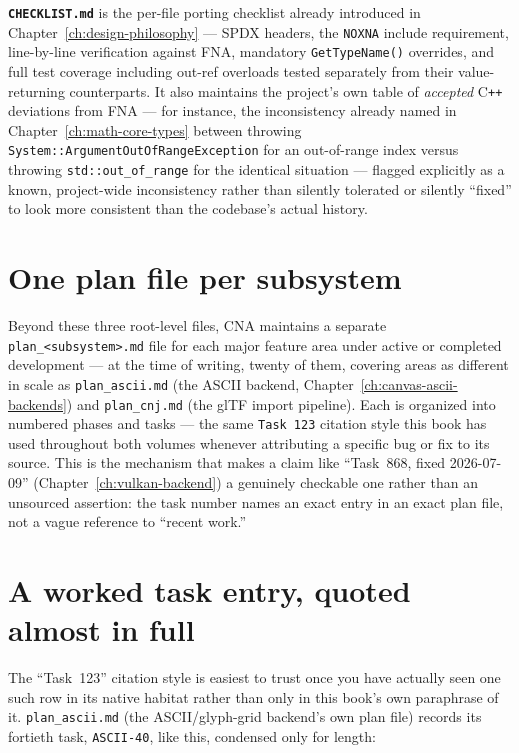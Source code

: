 \textbf{\texttt{CHECKLIST.md}} is the per-file porting checklist already introduced in
Chapter~\ref{ch:design-philosophy} --- SPDX headers, the \texttt{NOXNA} include requirement,
line-by-line verification against FNA, mandatory \texttt{GetTypeName()} overrides, and full
test coverage including out-ref overloads tested separately from their value-returning
counterparts. It also maintains the project's own table of \emph{accepted} C\texttt{++}
deviations from FNA --- for instance, the inconsistency already named in
Chapter~\ref{ch:math-core-types} between  throwing
\texttt{System::ArgumentOutOfRangeException} for an out-of-range index versus
 throwing \texttt{std::out\_of\_range} for the
identical situation --- flagged explicitly as a known, project-wide inconsistency rather than
silently tolerated or silently ``fixed'' to look more consistent than the codebase's actual
history.

\section{One plan file per subsystem}

Beyond these three root-level files, CNA maintains a separate \texttt{plan\_<subsystem>.md}
file for each major feature area under active or completed development --- at the time of
writing, twenty of them, covering areas as different in scale as \texttt{plan\_ascii.md} (the
ASCII backend, Chapter~\ref{ch:canvas-ascii-backends}) and \texttt{plan\_cnj.md}
(the glTF import pipeline). Each is organized into numbered phases and tasks --- the same
\texttt{Task~123} citation style this book has used throughout both volumes whenever
attributing a specific bug or fix to its source. This is the mechanism that makes a claim
like ``Task~868, fixed 2026-07-09'' (Chapter~\ref{ch:vulkan-backend}) a genuinely checkable
one rather than an unsourced assertion: the task number names an exact entry in an exact
plan file, not a vague reference to ``recent work.''

\section{A worked task entry, quoted almost in full}

The ``Task~123'' citation style is easiest to trust once you have actually seen one such row in
its native habitat rather than only in this book's own paraphrase of it. \texttt{plan\_ascii.md}
(the ASCII/glyph-grid backend's own plan file) records its fortieth task, \texttt{ASCII-40}, like
this, condensed only for length:

